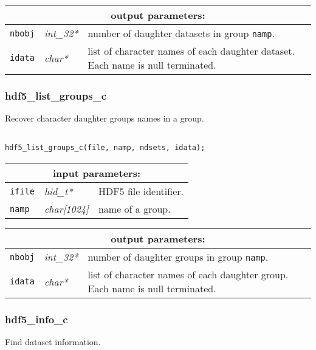 \vskip 0.8cm

\noindent
\begin{tabular}{|p{1.5cm}|p{2cm}|p{11cm}|}
\hline
\multicolumn{3}{|c|}{\bf output parameters:} \\
\hline
{\tt nbobj} & {\it int\_32*} & number of daughter datasets in group {\tt namp}. \\
\hline
{\tt idata} & {\it char*} & list of character names of each daughter dataset. Each name is null terminated. \\
\hline
\end{tabular}

\subsubsection{hdf5\_list\_groups\_c}

Recover character daughter groups names in a group.

\begin{verbatim}

hdf5_list_groups_c(file, namp, ndsets, idata);
\end{verbatim}

\noindent
\begin{tabular}{|p{1.5cm}|p{2cm}|p{11cm}|}
\hline
\multicolumn{3}{|c|}{\bf input parameters:} \\
\hline
{\tt ifile} & {\it hid\_t*} & HDF5 file identifier. \\
\hline
{\tt namp} & {\it char[1024]} & name of a group. \\
\hline
\end{tabular}

\vskip 0.8cm

\noindent
\begin{tabular}{|p{1.5cm}|p{2cm}|p{11cm}|}
\hline
\multicolumn{3}{|c|}{\bf output parameters:} \\
\hline
{\tt nbobj} & {\it int\_32*} & number of daughter groups in group {\tt namp}. \\
\hline
{\tt idata} & {\it char*} & list of character names of each daughter group. Each name is null terminated. \\
\hline
\end{tabular}

\subsubsection{hdf5\_info\_c}

Find dataset information.

